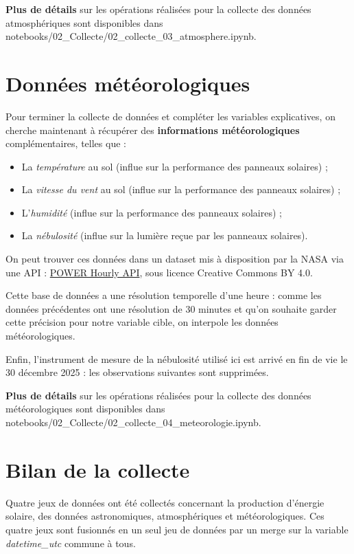 \textbf{Plus de détails} sur les opérations réalisées pour la collecte des données atmosphériques sont disponibles dans notebooks/02\_Collecte/02\_collecte\_03\_atmosphere.ipynb.

\section{Données météorologiques}

Pour terminer la collecte de données et compléter les variables explicatives, on cherche maintenant à récupérer des \textbf{informations météorologiques} complémentaires, telles que :

\begin{itemize}
\item La \textit{température} au sol (influe sur la performance des panneaux solaires) ;
\item La \textit{vitesse du vent} au sol (influe sur la performance des panneaux solaires) ;
\item L'\textit{humidité} (influe sur la performance des panneaux solaires) ;
\item La \textit{nébulosité} (influe sur la lumière reçue par les panneaux solaires).
\end{itemize}

On peut trouver ces données dans un dataset mis à disposition par la NASA via une API : \href{https://power.larc.nasa.gov/}{POWER Hourly API}, sous licence Creative Commons BY 4.0.

Cette base de données a une résolution temporelle d'une heure : comme les données précédentes ont une résolution de 30 minutes et qu’on souhaite garder cette précision pour notre variable cible, on interpole les données météorologiques.

Enfin, l’instrument de mesure de la nébulosité utilisé ici est arrivé en fin de vie le 30 décembre 2025 : les observations suivantes sont supprimées.

\textbf{Plus de détails} sur les opérations réalisées pour la collecte des données météorologiques sont disponibles dans notebooks/02\_Collecte/02\_collecte\_04\_meteorologie.ipynb.

\section{Bilan de la collecte}

Quatre jeux de données ont été collectés concernant la production d’énergie solaire, des données astronomiques, atmosphériques et météorologiques. Ces quatre jeux sont fusionnés en un seul jeu de données par un merge sur la variable \textit{datetime\_utc} commune à tous.

